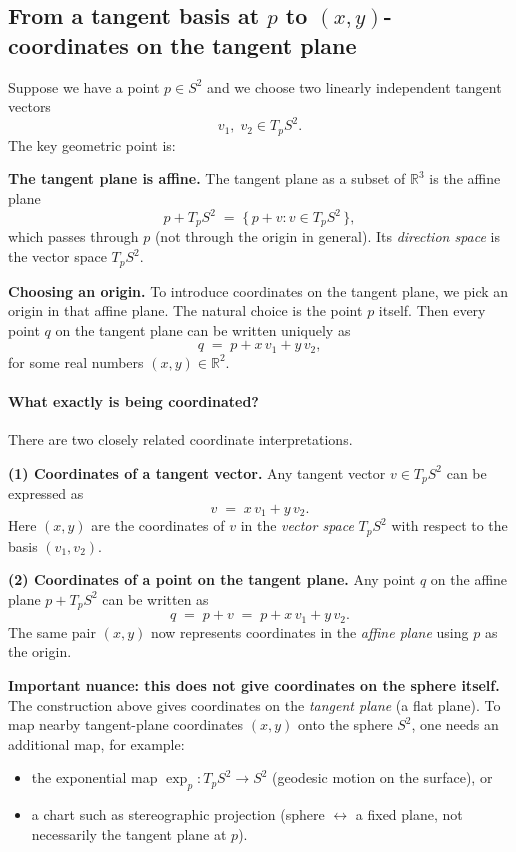 \documentclass[12pt,a4paper]{article}
\theoremstyle{plain}
\theoremstyle{definition}      %
\begin{document}
	
	
	\subsection*{From a tangent basis at $p$ to $(x,y)$-coordinates on the tangent plane}
	
	Suppose we have a point $p\in S^2$ and we choose two linearly independent tangent
	vectors
	\[
	v_1,\;v_2 \in T_pS^2.
	\]
	The key geometric point is:
	
	\medskip
	\noindent\textbf{The tangent plane is affine.}
	The tangent plane as a subset of $\mathbb{R}^3$ is the affine plane
	\[
	p + T_pS^2 \;=\;\{\,p+v : v\in T_pS^2\,\},
	\]
	which passes through $p$ (not through the origin in general).
	Its \emph{direction space} is the vector space $T_pS^2$.
	
	\medskip
	\noindent\textbf{Choosing an origin.}
	To introduce coordinates on the tangent plane, we pick an origin in that affine plane.
	The natural choice is the point $p$ itself. Then every point $q$ on the tangent plane
	can be written uniquely as
	\[
	q \;=\; p + x\,v_1 + y\,v_2,
	\]
	for some real numbers $(x,y)\in\mathbb{R}^2$.
	
	\paragraph{What exactly is being coordinated?}
	There are two closely related coordinate interpretations.
	
	\medskip
	\noindent\textbf{(1) Coordinates of a tangent vector.}
	Any tangent vector $v\in T_pS^2$ can be expressed as
	\[
	v \;=\; x\,v_1 + y\,v_2.
	\]
	Here $(x,y)$ are the coordinates of $v$ in the \emph{vector space} $T_pS^2$
	with respect to the basis $(v_1,v_2)$.
	
	\medskip
	\noindent\textbf{(2) Coordinates of a point on the tangent plane.}
	Any point $q$ on the affine plane $p+T_pS^2$ can be written as
	\[
	q \;=\; p + v \;=\; p + x\,v_1 + y\,v_2.
	\]
	The same pair $(x,y)$ now represents coordinates in the \emph{affine plane}
	using $p$ as the origin.
	
	\medskip
	\noindent\textbf{Important nuance: this does not give coordinates on the sphere itself.}
	The construction above gives coordinates on the \emph{tangent plane} (a flat plane).
	To map nearby tangent-plane coordinates $(x,y)$ onto the sphere $S^2$, one needs an
	additional map, for example:
	\begin{itemize}
		\item the exponential map $\exp_p: T_pS^2 \to S^2$ (geodesic motion on the surface), or
		\item a chart such as stereographic projection (sphere $\leftrightarrow$ a fixed plane,
		not necessarily the tangent plane at $p$).
	\end{itemize}
	
\end{document}
